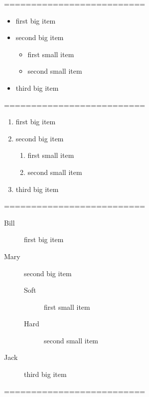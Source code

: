 ==========================
\begin{itemize}
\item first big item 
\item second big item
\begin{itemize}
\item first small item 
\item second small item
\end{itemize}
\item third big item
\end {itemize}

==========================

\begin{enumerate}
\item first big item 
\item second big item
\begin{enumerate}
\item first small item 
\item second small item
\end{enumerate}
\item third big item
\end {enumerate}

==========================

\begin{description}
\item[Bill] first big item 
\item[Mary] second big item
\begin{description}
\item[Soft] first small item 
\item[Hard] second small item
\end{description}
\item[Jack] third big item
\end {description}

==========================